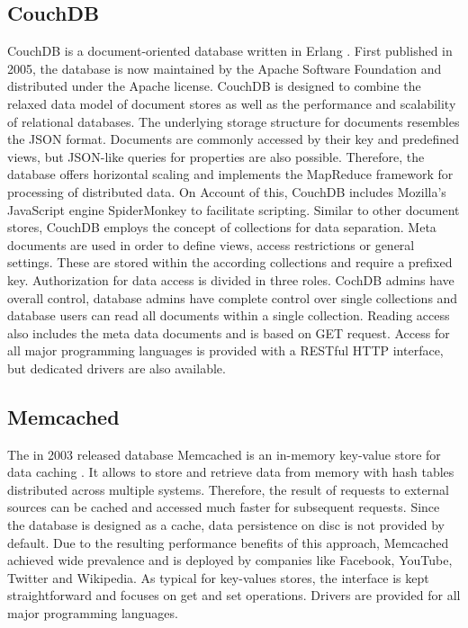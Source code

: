 \subsection{CouchDB}
CouchDB is a document-oriented database written in Erlang \cite{Anderson:2010}. First published in 2005, the database is now maintained by the Apache Software Foundation and distributed under the Apache license. CouchDB is designed to combine the relaxed data model of document stores as well as the performance and scalability of relational databases. The underlying storage structure for documents resembles the JSON format. Documents are commonly accessed by their key and predefined views, but JSON-like queries for properties are also possible. Therefore, the database offers horizontal scaling and implements the MapReduce framework for processing of distributed data. On Account of this, CouchDB includes Mozilla's JavaScript engine SpiderMonkey to facilitate scripting. Similar to other document stores, CouchDB employs the concept of collections for data separation. Meta documents are used in order to define views, access restrictions or general settings. These are stored within the according collections and require a prefixed key. Authorization for data access is divided in three roles. CochDB admins have overall control, database admins have complete control over single collections and database users can read all documents within a single collection. Reading access also includes the meta data documents and is based on GET request. Access for all major programming languages is provided with a RESTful HTTP interface, but dedicated drivers are also available.

\subsection{Memcached}
The in 2003 released database Memcached is an in-memory key-value store for data caching \cite{Dormando:2015}. It allows to store and retrieve data from memory with hash tables distributed across multiple systems. Therefore, the result of requests to external sources can be cached and accessed much faster for subsequent requests. Since the database is designed as a cache, data persistence on disc is not provided by default. Due to the resulting performance benefits of this approach, Memcached achieved wide prevalence and is deployed by companies like Facebook, YouTube, Twitter and Wikipedia. As typical for key-values stores, the interface is kept straightforward and focuses on get and set operations. Drivers are provided for all major programming languages.

